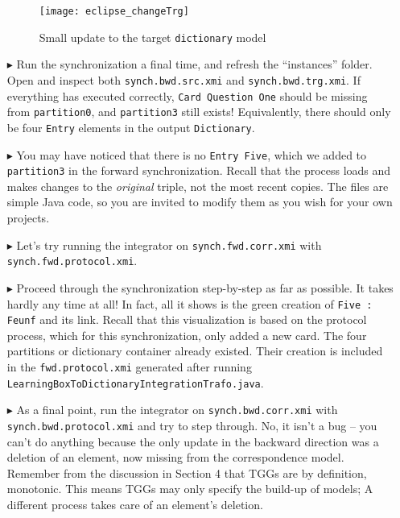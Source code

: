 \begin{itemize}
\newpage

\begin{figure}[htbp]
\begin{center}
  \texttt{[image: eclipse\_changeTrg]}
  \caption{Small update to the target \texttt{dictionary} model}
  \label{eclipse:changeTrg}
\end{center}
\end{figure}

\item[$\blacktriangleright$] Run the synchronization a final time, and refresh the ``instances'' folder. Open and inspect both \texttt{synch.bwd.src.xmi} and
\texttt{synch.\-bwd.\-trg.\-xmi}. If everything has executed correctly, \texttt{Card Question One} should be missing from \texttt{partition0}, and
\texttt{partition3} still exists! Equivalently, there should only be four \texttt{Entry} elements in the output \texttt{Dictionary}.

\item[$\blacktriangleright$] You may have noticed that there is no \texttt{Entry Five}, which we added to \texttt{partition3} in the forward
synchronization. Recall that the process loads and makes changes to the \emph{original} triple, not the most recent copies. The files are simple Java code, so
you are invited to modify them as you wish for your own projects.

\item[$\blacktriangleright$] Let's try running the integrator on \texttt{synch.fwd.corr.xmi} with \texttt{synch.\-fwd.\-prot\-o\-col.\-xmi}.

\item[$\blacktriangleright$] Proceed through the synchronization step-by-step as far as possible. It takes hardly any time at all! In fact, all it shows is the
green creation of \texttt{Five : Feunf} and its link. Recall that this visualization is based on the protocol process, which for this synchronization, only
added a new card. The four partitions or dictionary container already existed. Their creation is included in the \texttt{fwd.protocol.xmi} generated
after running \texttt{LearningBoxToDictionaryIntegrationTrafo.java}.

\item[$\blacktriangleright$] As a final point, run the integrator on \texttt{synch.bwd.corr.xmi} with \texttt{synch.bwd.protocol.xmi} and try to step through.
No, it isn't a bug -- you can't do anything because the only update in the backward direction was a deletion of an element, now missing from the correspondence
model. Remember from the discussion in Section 4 that TGGs are by definition, monotonic. This means TGGs may only specify the build-up of models; A different
process takes care of an element's deletion.

\end{itemize}
